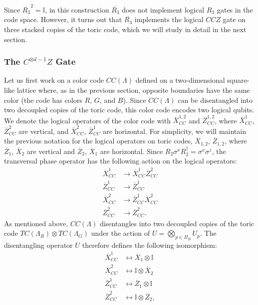 \documentclass[12pt]{article}
\def\II{\mathbb{I}}
\theoremstyle{definition}
\begin{document}
Since $\overline{R_3}^2 = \II$, in this construction $\overline{R_3}$ does not implement logical $R_3$ gates in the code space. However, it turns out that $\overline{R_3}$ implements the logical $CCZ$ gate on three stacked copies of the toric code, which we will study in detail in the next section.

\subsubsection{The $C^{\otimes d-1}Z$ Gate}
Let us first work on a color code $CC(\Lambda)$ defined on a two-dimensional square-like lattice where, as in the previous section, opposite boundaries have the same color (the code has colors $R$, $G$, and $B$). Since $CC(\Lambda)$ can be disentangled into two decoupled copies of the toric code, this color code encodes two logical qubits. We denote the logical operators of the color code with $\overline{X}^{1,2}_{CC}$ and $\overline{Z}^{1,2}_{CC}$, where $\overline{X}^1_{CC}$, $\overline{Z}^2_{CC}$ are vertical, and $\overline{X}^2_{CC}$, $\overline{Z}^1_{CC}$ are horizontal. For simplicity, we will maintain the previous notation for the logical operators on toric codes, $\overline{X}_{1,2}$, $\overline{Z}_{1,2}$, where $\overline{Z}_1$, $\overline{X}_2$ are vertical and $\overline{Z}_2$, $\overline{X}_1$ are horizontal. Since $R_2\sigma^xR^\dagger_2 = \sigma^x\sigma^z$, the transversal phase operator has the following action on the logical operators:
    \begin{align}
        \overline{X}^1_{CC}&\rightarrow\overline{X}^1_{CC}\overline{Z}^2_{CC}\\
        \overline{Z}^1_{CC}&\rightarrow\overline{Z}^1_{CC}\\
        \overline{X}^2_{CC}&\rightarrow\overline{Z}^1_{CC}\overline{X}^2_{CC}\\
        \overline{Z}^2_{CC}&\rightarrow\overline{Z}^2_{CC}.
    \end{align}
As mentioned above, $CC(\Lambda)$ disentangles into two decoupled copies of the toric code $TC(\Lambda_R)\otimes TC(\Lambda_G)$ under the action of $U = \bigotimes_{p\in\Pi_B}U_p$. The disentangling operator $U$ therefore defines the following isomorphism:
    \begin{align}
        \overline{X}^1_{CC}&\leftrightarrow\overline{X}_1\otimes\II\\
        \overline{X}^2_{CC}&\leftrightarrow\II\otimes\overline{X}_2\\
        \overline{Z}^1_{CC}&\leftrightarrow\overline{Z}_1\otimes\II\\
        \overline{Z}^2_{CC}&\leftrightarrow\II\otimes\overline{Z}_2,
    \end{align}
\end{document}
